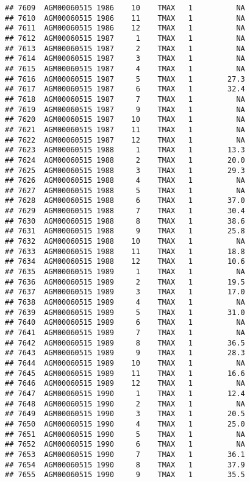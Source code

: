 \documentclass{article}\usepackage[]{graphicx}\usepackage[]{color}
\makeatletter
\newenvironment{kframe}{%
 \def\at@end@of@kframe{}%
 \ifinner\ifhmode%
  \def\at@end@of@kframe{\end{minipage}}%
  \begin{minipage}{\columnwidth}%
 \fi\fi%
 \def\FrameCommand##1{\hskip\@totalleftmargin \hskip-\fboxsep
 \colorbox{shadecolor}{##1}\hskip-\fboxsep
     \hskip-\linewidth \hskip-\@totalleftmargin \hskip\columnwidth}%
 \MakeFramed {\advance\hsize-\width
   \@totalleftmargin\z@ \linewidth\hsize
   \@setminipage}}%
 {\par\unskip\endMakeFramed%
 \at@end@of@kframe}
\newenvironment{knitrout}{}{} %
\makeatother
\begin{document}
\begin{knitrout}
\begin{kframe}
\begin{verbatim}
## 7609  AGM00060515 1986    10    TMAX   1          NA
## 7610  AGM00060515 1986    11    TMAX   1          NA
## 7611  AGM00060515 1986    12    TMAX   1          NA
## 7612  AGM00060515 1987     1    TMAX   1          NA
## 7613  AGM00060515 1987     2    TMAX   1          NA
## 7614  AGM00060515 1987     3    TMAX   1          NA
## 7615  AGM00060515 1987     4    TMAX   1          NA
## 7616  AGM00060515 1987     5    TMAX   1        27.3
## 7617  AGM00060515 1987     6    TMAX   1        32.4
## 7618  AGM00060515 1987     7    TMAX   1          NA
## 7619  AGM00060515 1987     9    TMAX   1          NA
## 7620  AGM00060515 1987    10    TMAX   1          NA
## 7621  AGM00060515 1987    11    TMAX   1          NA
## 7622  AGM00060515 1987    12    TMAX   1          NA
## 7623  AGM00060515 1988     1    TMAX   1        13.3
## 7624  AGM00060515 1988     2    TMAX   1        20.0
## 7625  AGM00060515 1988     3    TMAX   1        29.3
## 7626  AGM00060515 1988     4    TMAX   1          NA
## 7627  AGM00060515 1988     5    TMAX   1          NA
## 7628  AGM00060515 1988     6    TMAX   1        37.0
## 7629  AGM00060515 1988     7    TMAX   1        30.4
## 7630  AGM00060515 1988     8    TMAX   1        38.6
## 7631  AGM00060515 1988     9    TMAX   1        25.8
## 7632  AGM00060515 1988    10    TMAX   1          NA
## 7633  AGM00060515 1988    11    TMAX   1        18.8
## 7634  AGM00060515 1988    12    TMAX   1        10.6
## 7635  AGM00060515 1989     1    TMAX   1          NA
## 7636  AGM00060515 1989     2    TMAX   1        19.5
## 7637  AGM00060515 1989     3    TMAX   1        17.0
## 7638  AGM00060515 1989     4    TMAX   1          NA
## 7639  AGM00060515 1989     5    TMAX   1        31.0
## 7640  AGM00060515 1989     6    TMAX   1          NA
## 7641  AGM00060515 1989     7    TMAX   1          NA
## 7642  AGM00060515 1989     8    TMAX   1        36.5
## 7643  AGM00060515 1989     9    TMAX   1        28.3
## 7644  AGM00060515 1989    10    TMAX   1          NA
## 7645  AGM00060515 1989    11    TMAX   1        16.6
## 7646  AGM00060515 1989    12    TMAX   1          NA
## 7647  AGM00060515 1990     1    TMAX   1        12.4
## 7648  AGM00060515 1990     2    TMAX   1          NA
## 7649  AGM00060515 1990     3    TMAX   1        20.5
## 7650  AGM00060515 1990     4    TMAX   1        25.0
## 7651  AGM00060515 1990     5    TMAX   1          NA
## 7652  AGM00060515 1990     6    TMAX   1          NA
## 7653  AGM00060515 1990     7    TMAX   1        36.1
## 7654  AGM00060515 1990     8    TMAX   1        37.9
## 7655  AGM00060515 1990     9    TMAX   1        35.5

\end{verbatim}
\end{kframe}
\end{knitrout}
\end{document}
